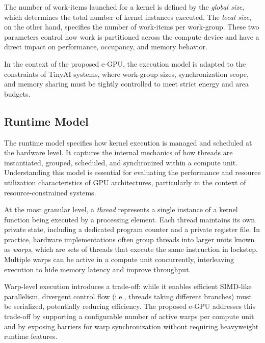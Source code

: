             The number of work-items launched for a kernel is defined by the \emph{global size}, which determines the total number of kernel instances executed. The \emph{local size}, on the other hand, specifies the number of work-items per work-group. These two parameters control how work is partitioned across the compute device and have a direct impact on performance, occupancy, and memory behavior.
    
            In the context of the proposed \mbox{e-GPU}, the execution model is adapted to the constraints of TinyAI systems, where work-group sizes, synchronization scope, and memory sharing must be tightly controlled to meet strict energy and area budgets.

        \subsection{Runtime Model}
    
            The runtime model specifies how kernel execution is managed and scheduled at the hardware level. It captures the internal mechanics of how threads are instantiated, grouped, scheduled, and synchronized within a compute unit. Understanding this model is essential for evaluating the performance and resource utilization characteristics of GPU architectures, particularly in the context of resource-constrained systems.
    
            At the most granular level, a \emph{thread} represents a single instance of a kernel function being executed by a processing element. Each thread maintains its own private state, including a dedicated program counter and a private register file. In practice, hardware implementations often group threads into larger units known as \emph{warps}, which are sets of threads that execute the same instruction in lockstep. Multiple warps can be active in a compute unit concurrently, interleaving execution to hide memory latency and improve throughput.
    
            Warp-level execution introduces a trade-off: while it enables efficient SIMD-like parallelism, divergent control flow (i.e., threads taking different branches) must be serialized, potentially reducing efficiency. The proposed \mbox{e-GPU} addresses this trade-off by supporting a configurable number of active warps per compute unit and by exposing barriers for warp synchronization without requiring heavyweight runtime features.
    
